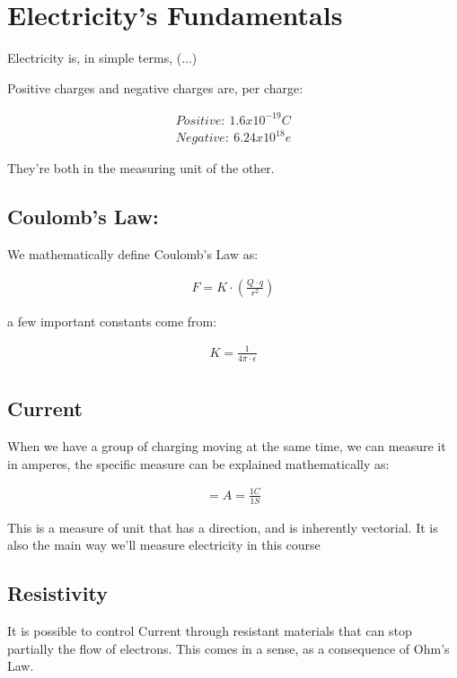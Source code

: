 \documentclass[11pt,fleqn]{book} %
\begin{document}
\chapter{Electricity's Fundamentals}

Electricity is, in simple terms, (...)

Positive charges and negative charges are, per charge:

\begin{gather}
    Positive: \ 1.6x10^{-19}C \\
    Negative: \ 6.24x10^{18}e
\end{gather}

They're both in the measuring unit of the other.

\section{Coulomb's Law:}

We mathematically define Coulomb's Law as:

\begin{gather}
    F = K \cdot (\frac{Q\cdot q}{r^2})
\end{gather}

a few important constants come from:

\begin{gather}
    K = \frac{1}{4\pi\cdot \epsilon}\\
\end{gather}

\section{Current}

When we have a group of charging moving at the same time, we can measure it in amperes, the specific 
measure can be explained mathematically as:

\begin{gather}
    [I] = A = \frac{1C}{1S}
\end{gather}

This is a measure of unit that has a direction, and is inherently vectorial.
It is also the main way we'll measure electricity in this course

\section[short]{Resistivity}

It is possible to control Current through resistant materials that can stop partially the flow of electrons. 
This comes in a sense, as a consequence of Ohm's Law. 
\end{document}
